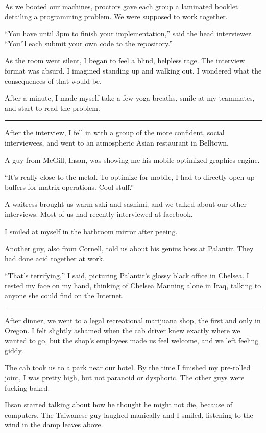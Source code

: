 As we booted our machines, proctors gave each group a laminated booklet
detailing a programming problem.  We were supposed to work together.

``You have until 3pm to finish your implementation,'' said the head interviewer.
``You'll each submit your own code to the repository.''

As the room went silent, I began to feel a blind, helpless rage.  The interview
format was absurd.  I imagined standing up and walking out.  I wondered what the
consequences of that would be.  

After a minute, I made myself take a few yoga breaths, smile at my teammates,
and start to read the problem.

\plainfancybreak{12pt}{2}{}

After the interview, I fell in with a group of the more confident, social
interviewees, and went to an atmospheric Asian restaurant in Belltown.

A guy from McGill, Ihsan, was showing me his mobile-optimized graphics engine.

``It's really close to the metal.  To optimize for mobile, I had to directly
open up buffers for matrix operations.  Cool stuff.''

A waitress brought us warm saki and sashimi, and we talked about our other
interviews.  Most of us had recently interviewed at facebook.

I smiled at myself in the bathroom mirror after peeing.

Another guy, also from Cornell, told us about his genius boss at Palantir.  They
had done acid together at work.

``That's terrifying,'' I said, picturing Palantir's glossy black office in
Chelsea.  I rested my face on my hand, thinking of Chelsea Manning alone in
Iraq, talking to anyone she could find on the Internet.

\plainfancybreak{12pt}{2}{}

After dinner, we went to a legal recreational marijuana shop, the first and only
in Oregon.  I felt slightly ashamed when the cab driver knew exactly where we
wanted to go, but the shop's employees made us feel welcome, and we left feeling
giddy.  

The cab took us to a park near our hotel.  By the time I finished my pre-rolled
joint, I was pretty high, but not paranoid or dysphoric.   The other guys were
fucking baked.  

Ihsan started talking about how he thought he might not die, because of
computers.  The Taiwanese guy laughed manically and I smiled, listening to the
wind in the damp leaves above.

